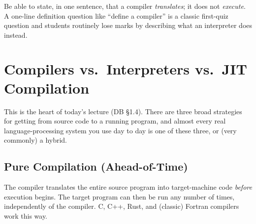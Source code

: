 \documentclass[11pt]{article}
\begin{document}
\begin{center}
\end{center}

\begin{examfocus}
Be able to state, in one sentence, that a compiler \emph{translates}; it does not
\emph{execute}. A one-line definition question like ``define a compiler'' is a classic
first-quiz question and students routinely lose marks by describing what an interpreter does
instead.
\end{examfocus}

\section{Compilers vs.\ Interpreters vs.\ JIT Compilation}

This is the heart of today's lecture (DB \S1.4). There are three broad strategies for getting
from source code to a running program, and almost every real language-processing system you use
day to day is one of these three, or (very commonly) a hybrid.

\subsection{Pure Compilation (Ahead-of-Time)}

\dbtag The compiler translates the entire source program into target-machine code \emph{before}
execution begins. The target program can then be run any number of times, independently of the
compiler. C, C++, Rust, and (classic) Fortran compilers work this way.
\end{document}

